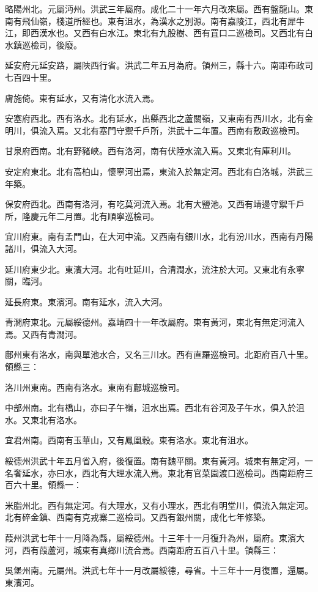略陽州北。元屬沔州。洪武三年屬府。成化二十一年六月改來屬。西有盤龍山。東南有飛仙嶺，棧道所經也。東有沮水，為漢水之別源。南有嘉陵江，西北有犀牛江，即西漢水也。又西有白水江。東北有九股樹、西有罝口二巡檢司。又西北有白水鎮巡檢司，後廢。

延安府元延安路，屬陜西行省。洪武二年五月為府。領州三，縣十六。南距布政司七百四十里。

膚施倚。東有延水，又有清化水流入焉。

安塞府西北。西有洛水。北有延水，出縣西北之蘆關嶺，又東南有西川水，北有金明川，俱流入焉。又北有塞門守禦千戶所，洪武十二年置。西南有敷政巡檢司。

甘泉府西南。北有野豬峽。西有洛河，南有伏陸水流入焉。又東北有庫利川。

安定府東北。北有高柏山，懷寧河出焉，東流入於無定河。西北有白洛城，洪武三年築。

保安府西北。西南有洛河，有吃莫河流入焉。北有大鹽池。又西有靖邊守禦千戶所，隆慶元年二月置。北有順寧巡檢司。

宜川府東。南有孟門山，在大河中流。又西南有銀川水，北有汾川水，西南有丹陽諸川，俱流入大河。

延川府東少北。東濱大河。北有吐延川，合清澗水，流注於大河。又東北有永寧關，臨河。

延長府東。東濱河。南有延水，流入大河。

青澗府東北。元屬綏德州。嘉靖四十一年改屬府。東有黃河，東北有無定河流入焉。又西有青澗河。

鄜州東有洛水，南與單池水合，又名三川水。西有直羅巡檢司。北距府百八十里。領縣三：

洛川州東南。西南有洛水。東南有鄜城巡檢司。

中部州南。北有橋山，亦曰子午嶺，沮水出焉。西北有谷河及子午水，俱入於沮水。又東北有洛水。

宜君州南。西南有玉華山，又有鳳凰穀。東有洛水。東北有沮水。

綏德州洪武十年五月省入府，後復置。南有魏平關。東有黃河。城東有無定河，一名奢延水，亦曰水，西北有大理水流入焉。東北有官菜園渡口巡檢司。西南距府三百六十里。領縣一：

米脂州北。西有無定河。有大理水，又有小理水，西北有明堂川，俱流入無定河。北有碎金鎮、西南有克戎寨二巡檢司。又西有銀州關，成化七年修築。

葭州洪武七年十一月降為縣，屬綏德州。十三年十一月復升為州，屬府。東濱大河，西有葭蘆河，城東有真鄉川流合焉。西南距府五百八十里。領縣三：

吳堡州南。元屬州。洪武七年十一月改屬綏德，尋省。十三年十一月復置，還屬。東濱河。

